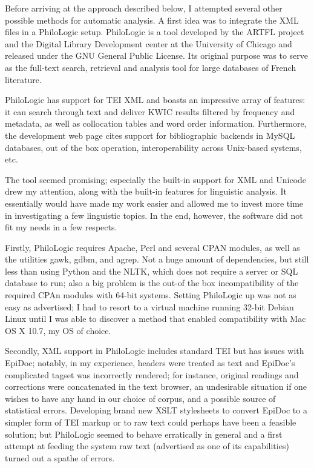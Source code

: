 Before arriving at the approach described below, I attempted several other
possible methods for automatic analysis. A first idea was to integrate the XML
files in a PhiloLogic setup.  PhiloLogic is a tool developed by the ARTFL
project and the Digital Library Development center at the University of Chicago
and released under the GNU General Public License. Its original purpose was to
serve as the full-text search, retrieval and analysis tool for large
databases of French literature.

PhiloLogic has support for TEI XML and boasts an impressive
array of features: it can search through text and deliver KWIC results
filtered by frequency and metadata, as well as collocation tables and word
order information.  Furthermore, the development web page cites support for
bibliographic backends in MySQL databases, out of the box operation,
interoperability across Unix-based systems, etc.

The tool seemed promising; especially the built-in support for XML and
Unicode drew my attention, along with the built-in features for linguistic
analysis. It essentially would have made my work easier and allowed me to
invest more time in investigating a few linguistic topics. In the end, however,
the software did not fit my needs in a few respects.

Firstly, PhiloLogic requires Apache, Perl and several CPAN modules, as well as
the utilities gawk, gdbm, and agrep.  Not a huge amount of dependencies, but
still less than using Python and the NLTK, which does not require a server or
SQL database to run; also a big problem is the out-of the box incompatibility
of the required CPAn  modules with 64-bit systems. Setting PhiloLogic up was
not as easy as advertised; I had to resort to a virtual machine running 32-bit
Debian Linux until I was able to discover a method that enabled compatibility
with Mac OS X 10.7, my OS of choice.

Secondly, XML support in PhiloLogic includes standard TEI  but has issues with
EpiDoc; notably, in my experience, headers were treated as text and EpiDoc's
complicated tagset was incorrectly rendered; for instance, original readings
and corrections were concatenated in the text browser, an undesirable situation
if one wishes to have any hand in our choice of corpus, and a possible source of
statistical errors.  Developing brand new XSLT stylesheets to convert EpiDoc to
a simpler form of TEI markup or to raw text could perhaps have been a feasible
solution; but PhiloLogic seemed to behave erratically in general and a first
attempt at feeding the system raw text (advertised as one of its capabilities)
turned out a spathe of errors.

